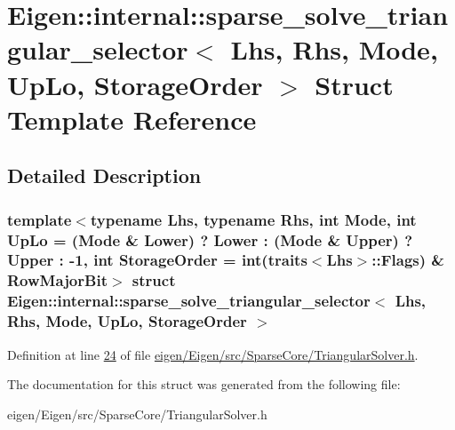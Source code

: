 \hypertarget{struct_eigen_1_1internal_1_1sparse__solve__triangular__selector}{}\section{Eigen\+:\+:internal\+:\+:sparse\+\_\+solve\+\_\+triangular\+\_\+selector$<$ Lhs, Rhs, Mode, Up\+Lo, Storage\+Order $>$ Struct Template Reference}
\label{struct_eigen_1_1internal_1_1sparse__solve__triangular__selector}


\subsection{Detailed Description}
\subsubsection*{template$<$typename Lhs, typename Rhs, int Mode, int Up\+Lo = (\+Mode \& Lower) ? Lower \+: (\+Mode \& Upper) ? Upper \+: -\/1, int Storage\+Order = int(traits$<$\+Lhs$>$\+::\+Flags) \& Row\+Major\+Bit$>$\newline
struct Eigen\+::internal\+::sparse\+\_\+solve\+\_\+triangular\+\_\+selector$<$ Lhs, Rhs, Mode, Up\+Lo, Storage\+Order $>$}



Definition at line \hyperlink{eigen_2_eigen_2src_2_sparse_core_2_triangular_solver_8h_source_l00024}{24} of file \hyperlink{eigen_2_eigen_2src_2_sparse_core_2_triangular_solver_8h_source}{eigen/\+Eigen/src/\+Sparse\+Core/\+Triangular\+Solver.\+h}.



The documentation for this struct was generated from the following file\+:\begin{DoxyCompactItemize}
\item 
eigen/\+Eigen/src/\+Sparse\+Core/\+Triangular\+Solver.\+h\end{DoxyCompactItemize}
